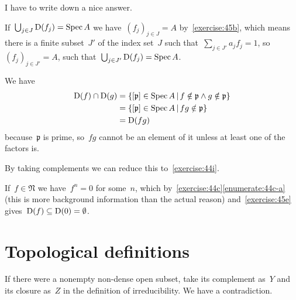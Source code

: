 \begin{exercise} %
  \label{exercise:45b}
  I have to write down a nice answer.
\end{exercise}

\begin{exercise}
  \label{exercise:45c}
  If~$\bigcup_{j\in J}\operatorname{D}(f_j)=\operatorname{Spec} A$ we have~$(f_j)_{j\in J}=A$ by~\autoref{exercise:45b}, which means there is a finite subset~$J'$ of the index set~$J$ such that~$\sum_{j\in J'}a_jf_j=1$, so~$(f_j)_{j\in J'}=A$, such that~$\bigcup_{j\in J'}\operatorname{D}(f_j)=\operatorname{Spec} A$.
\end{exercise}

\begin{exercise}
  We have
  \begin{equation}
    \begin{aligned}
      \operatorname{D}(f)\cap\operatorname{D}(g)&=\left\{ [\mathfrak{p}]\in\operatorname{Spec} A\,|\,f\notin\mathfrak{p}\wedge g\notin\mathfrak{p} \right\} \\
      &=\left\{ [\mathfrak{p}]\in\operatorname{Spec} A\,|\,fg\notin\mathfrak{p} \right\} \\
      &=\operatorname{D}(fg)
    \end{aligned}
  \end{equation}
  because~$\mathfrak{p}$ is prime, so~$fg$ cannot be an element of it unless at least one of the factors is.
\end{exercise}

\begin{exercise} %
  \label{exercise:45e}
  By taking complements we can reduce this to~\autoref{exercise:44i}.
\end{exercise}

\begin{exercise}
  If~$f\in\mathfrak{N}$ we have~$f^n=0$ for some~$n$, which by~\autoref{exercise:44c}\ref{enumerate:44c-a} (this is more background information than the actual reason) and~\autoref{exercise:45e} gives~$\operatorname{D}(f)\subseteq\operatorname{D}(0)=\emptyset$.
\end{exercise}


\section{Topological definitions}

\begin{exercise}
  If there were a nonempty non-dense open subset, take its complement as~$Y$ and its closure as~$Z$ in the definition of irreducibility. We have a contradiction.
\end{exercise}

